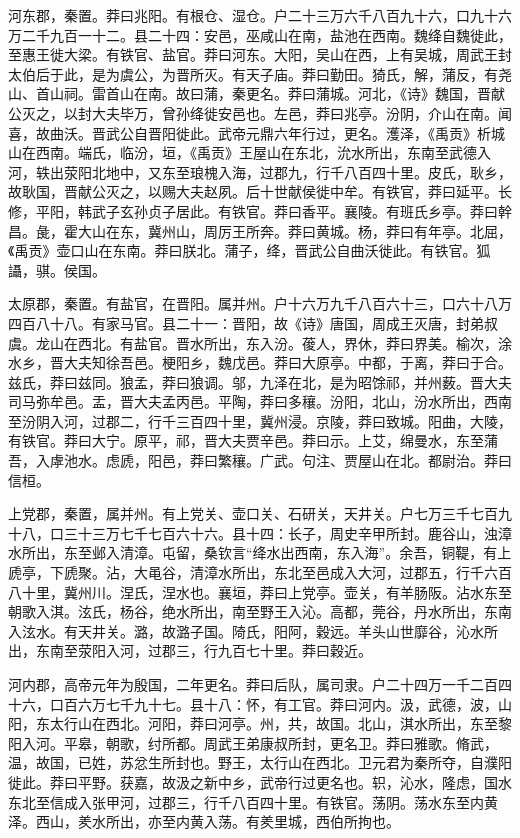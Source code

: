 \documentclass[]{article}
\begin{document}
河东郡，秦置。莽曰兆阳。有根仓、湿仓。户二十三万六千八百九十六，口九十六万二千九百一十二。县二十四：安邑，巫咸山在南，盐池在西南。魏绛自魏徙此，至惠王徙大梁。有铁官、盐官。莽曰河东。大阳，吴山在西，上有吴城，周武王封太伯后于此，是为虞公，为晋所灭。有天子庙。莽曰勤田。猗氏，解，蒲反，有尧山、首山祠。雷首山在南。故曰蒲，秦更名。莽曰蒲城。河北，《诗》魏国，晋献公灭之，以封大夫毕万，曾孙绛徙安邑也。左邑，莽曰兆亭。汾阴，介山在南。闻喜，故曲沃。晋武公自晋阳徙此。武帝元鼎六年行过，更名。濩泽，《禹贡》析城山在西南。端氏，临汾，垣，《禹贡》王屋山在东北，沇水所出，东南至武德入河，轶出荥阳北地中，又东至琅槐入海，过郡九，行千八百四十里。皮氏，耿乡，故耿国，晋献公灭之，以赐大夫赵夙。后十世献侯徙中牟。有铁官，莽曰延平。长修，平阳，韩武子玄孙贞子居此。有铁官。莽曰香平。襄陵。有班氏乡亭。莽曰幹昌。彘，霍大山在东，冀州山，周厉王所奔。莽曰黄城。杨，莽曰有年亭。北屈，《禹贡》壶口山在东南。莽曰朕北。蒲子，绛，晋武公自曲沃徙此。有铁官。狐讘，骐。侯国。

太原郡，秦置。有盐官，在晋阳。属并州。户十六万九千八百六十三，口六十八万四百八十八。有家马官。县二十一：晋阳，故《诗》唐国，周成王灭唐，封弟叔虞。龙山在西北。有盐官。晋水所出，东入汾。葰人，界休，莽曰界美。榆次，涂水乡，晋大夫知徐吾邑。梗阳乡，魏戊邑。莽曰大原亭。中都，于离，莽曰于合。兹氏，莽曰兹同。狼孟，莽曰狼调。邬，九泽在北，是为昭馀祁，并州薮。晋大夫司马弥牟邑。盂，晋大夫孟丙邑。平陶，莽曰多穰。汾阳，北山，汾水所出，西南至汾阴入河，过郡二，行千三百四十里，冀州浸。京陵，莽曰致城。阳曲，大陵，有铁官。莽曰大宁。原平，祁，晋大夫贾辛邑。莽曰示。上艾，绵曼水，东至蒲吾，入虖池水。虑虒，阳邑，莽曰繁穰。广武。句注、贾屋山在北。都尉治。莽曰信桓。

上党郡，秦置，属并州。有上党关、壶口关、石研关，天井关。户七万三千七百九十八，口三十三万七千七百六十六。县十四：长子，周史辛甲所封。鹿谷山，浊漳水所出，东至邺入清漳。屯留，桑钦言``绛水出西南，东入海''。余吾，铜鞮，有上虒亭，下虒聚。沾，大黾谷，清漳水所出，东北至邑成入大河，过郡五，行千六百八十里，冀州川。涅氏，涅水也。襄垣，莽曰上党亭。壶关，有羊肠阪。沾水东至朝歌入淇。泫氏，杨谷，绝水所出，南至野王入沁。高都，莞谷，丹水所出，东南入泫水。有天井关。潞，故潞子国。陭氏，阳阿，穀远。羊头山世靡谷，沁水所出，东南至荥阳入河，过郡三，行九百七十里。莽曰穀近。

河内郡，高帝元年为殷国，二年更名。莽曰后队，属司隶。户二十四万一千二百四十六，口百六万七千九十七。县十八：怀，有工官。莽曰河内。汲，武德，波，山阳，东太行山在西北。河阳，莽曰河亭。州，共，故国。北山，淇水所出，东至黎阳入河。平皋，朝歌，纣所都。周武王弟康叔所封，更名卫。莽曰雅歌。脩武，温，故国，已姓，苏忿生所封也。野王，太行山在西北。卫元君为秦所夺，自濮阳徙此。莽曰平野。获嘉，故汲之新中乡，武帝行过更名也。轵，沁水，隆虑，国水东北至信成入张甲河，过郡三，行千八百四十里。有铁官。荡阴。荡水东至内黄泽。西山，羑水所出，亦至内黄入荡。有羑里城，西伯所拘也。
\end{document}
